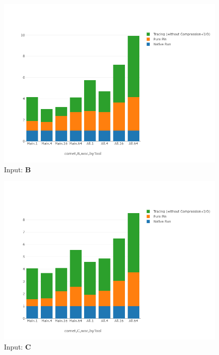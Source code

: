 \begin{figure}[!t]
\centering
\includegraphics[width=6in]{figs.comet/comet_chartDet_B_woc_byTool_p3_5.png}
\caption{ Input: \textbf{B}
}
\label{comet_chartDet_B_woc_byTool_p3_5}
\end{figure}

\begin{figure}[!t]
\centering
\includegraphics[width=6in]{figs.comet/comet_chartDet_C_woc_byTool_p3_5.png}
\caption{ Input: \textbf{C}
}
\label{comet_chartDet_C_woc_byTool_p3_5}
\end{figure}







